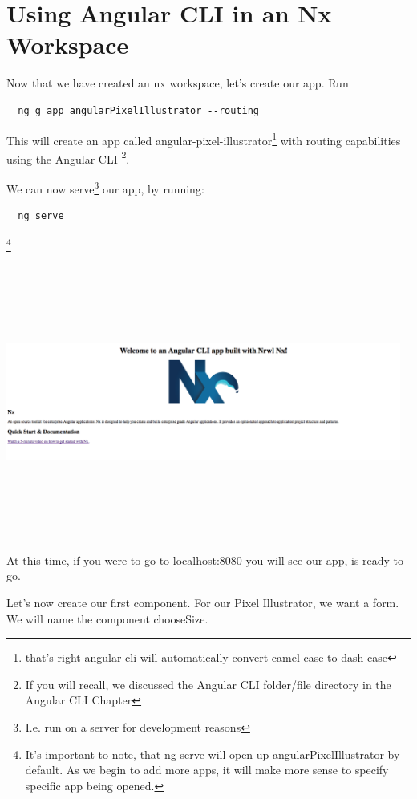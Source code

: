 \maketitle{}
\section{ Using Angular CLI in an Nx Workspace }

Now that we have created an nx workspace, let's create our app. Run
\begin{verbatim}
  ng g app angularPixelIllustrator --routing
\end{verbatim}

This will create an app called angular-pixel-illustrator\footnote{that's right
angular cli will automatically convert camel case to dash case} with routing
capabilities using the Angular CLI \footnote{If you will recall, we discussed
the Angular CLI folder/file directory in the Angular CLI Chapter}.

We can now serve\footnote{I.e. run on a server for development reasons} our app,
by running:
\begin{verbatim}
  ng serve
\end{verbatim} \footnote{It's important to note, that ng serve will open up
angularPixelIllustrator by default. As we begin to add more apps, it will make
more sense to specify specific app being opened.}


\includegraphics[width=13cm, height=9cm]{angular-cli-post-nx/angular_nx_initial_screen}

At this time, if you were to go to localhost:8080 you will see our app, is
ready to go.

Let's now create our first component. For our Pixel Illustrator, we want a form.
We will name the component chooseSize.

